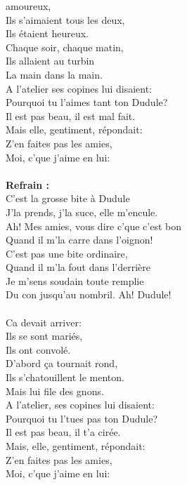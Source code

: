 \vspace{-0.3cm}
 amoureux,
\\Ils s'aimaient tous les deux,
\\Ils étaient heureux.
\\Chaque soir, chaque matin,
\\Ils allaient au turbin
\\La main dans la main.
\\A l'atelier ses copines lui disaient:
\\Pourquoi tu l'aimes tant ton Dudule?
\\Il est pas beau, il est mal fait.
\\Mais elle, gentiment, répondait:
\\Z'en faites pas les amies,
\\Moi, c'que j'aime en lui:
\\\\\textbf{Refrain :}
\\C'est la grosse bite à Dudule
\\J'la prends, j'la suce, elle m'encule.
\\Ah! Mes amies, vous dire c'que c'est bon
\\Quand il m'la carre dans l'oignon!
\\C'est pas une bite ordinaire,
\\Quand il m'la fout dans l'derrière
\\Je m'sens soudain toute remplie
\\Du con jusqu'au nombril. Ah! Dudule!
\\\\Ca devait arriver:
\\Ils se sont mariés,
\\Ils ont convolé.
\\D'abord ça tournait rond,
\\Ils s'chatouillent le menton.
\\Mais lui file des gnons.
\\A l'atelier, ses copines lui disaient:
\\Pourquoi tu l'tues pas ton Dudule?
\\Il est pas beau, il t'a cirée.
\\Mais, elle, gentiment, répondait:
\\Z'en faites pas les amies,
\\Moi, c'que j'aime en lui:

\breakpage
